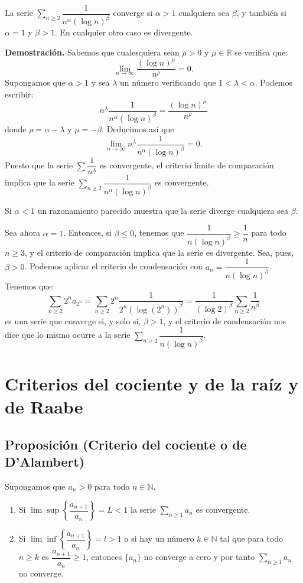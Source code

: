 \documentclass[10pt,a4paper]{article}
\begin{document}
	La serie $\displaystyle \sum_{n \geq 2} \dfrac{1}{n^\alpha (\log n)^\beta}$ converge si $\alpha > 1$ cualquiera sea $\beta$, y también si $\alpha = 1$ y $\beta > 1$. En cualquier otro caso es divergente.
	
	\textbf{Demostración. }Sabemos que cualesquiera sean $\rho > 0$ y $\mu \in \mathbb{R}$ se verifica que:
	$$ \lim_{n \rightarrow \infty} \dfrac{(\log n) ^\mu}{n^\rho} = 0.$$
	Supongamos que $\alpha > 1$ y sea $\lambda$ un número verificando que $ 1 < \lambda < \alpha$. Podemos escribir:
	$$n ^\lambda \dfrac{1}{n^\alpha (\log n) ^\beta} = \dfrac{(\log n) ^\mu}{n^\rho}$$
	donde $\rho = \alpha - \lambda$ y $\mu = - \beta$. Deducimos así que 
	$$ \lim_{n \rightarrow \infty} n^\lambda \dfrac{1}{n^\alpha (\log n) ^\beta} = 0.$$
	Puesto que la serie $\sum \dfrac{1}{n^\lambda}$ es convergente, el criterio límite de comparación implica que la serie $\displaystyle\sum _{n \geq 2} \dfrac{1}{n^\alpha (\log n) ^\beta}$ es convergente.
	
	Si $\alpha < 1$ un razonamiento parecido muestra que la serie diverge cualquiera sea $\beta$.
	
	Sea ahora $\alpha = 1$. Entonces, si $\beta \leq 0$, tenemos que $\dfrac{1}{n (\log n) ^\beta} \geq \dfrac{1}{n}$ para todo $n \geq 3$, y el criterio de comparación implica que la serie es divergente. Sea, pues, $\beta > 0$. Podemos aplicar el criterio de condensación con $a_n = \dfrac{1}{n (\log n) ^\beta}$. Tenemos que:
	$$\sum_{n \geq 2} 2^n a_{2^n} = \sum_{n \geq 2} 2^n \dfrac{1}{2^n (\log (2^n)) ^\beta} = \dfrac{1}{(\log 2) ^\beta} \sum_{n \geq 2} \dfrac{1}{n^\beta}$$
	es una serie que converge si, y solo si, $\beta > 1$, y el criterio de condensación nos dice que lo mismo ocurre a la serie $\displaystyle\sum_{n \geq 2}\dfrac{1}{n (\log n) ^\beta}$.	
	
	\newpage
	
	\section{Criterios del cociente y de la raíz y de Raabe}
	
	\subsection{Proposición (Criterio del cociente o de D'Alambert)}
	Supongamos que $a_n > 0$ para todo $n \in \mathbb{N}$.
	
	\begin{enumerate}[label = \alph*)]
		\item Si $\lim \sup \left\{\dfrac{a_{n+1}}{a_n}\right\} = L < 1$ la serie $\displaystyle \sum _{n \geq 1} a_n$ es convergente.
		\item Si $\lim \inf \left\{\dfrac{a_{n+1}}{a_n}\right\} = l > 1$ o si hay un número $k \in \mathbb{N}$ tal que para todo $n \geq k$ es $\dfrac{a_{n+1}}{a_n} \geq 1$, entonces $\{a_n\}$ no converge a cero y por tanto $\displaystyle \sum _{n \geq 1} a_n$ no converge.
	\end{enumerate}
\end{document}
